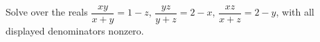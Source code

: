Solve over the reals $\dfrac{xy}{x+y}=1-z$, $\dfrac{yz}{y+z}=2-x$, $\dfrac{xz}{x+z}=2-y$, with all displayed denominators nonzero.
